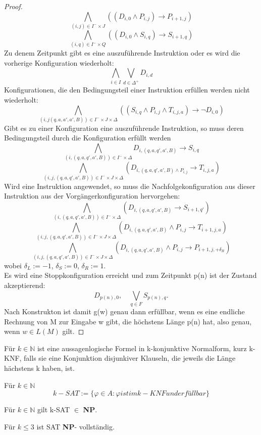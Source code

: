 \begin{proof}
\[        \]
        \[
            \bigwedge \limits_{(i, j) \in I^- \times J } ((D_{i,0} \wedge P_{i, j}) \to P_{i+ 1, j} )
        \]
        \[
            \bigwedge \limits_{(i,q) \in I^- \times Q } ((D_{i,0} \wedge S_{i, q}) \to S_{i+ 1, q})
        \]
        Zu denem Zeitpunkt gibt es eine auszuführende Instruktion oder es wird die vorherige Konfiguration wiederholt:
        \[
            \bigwedge \limits_{i \in I} \bigvee \limits_{d \in \Delta^+} D_{i, d}
        \]
        Konfigurationen, die den Bedingungsteil einer Instruktion erfüllen werden nicht wiederholt:
        \[
            \bigwedge \limits_{(i, j(q, a, a', a', B)) \in I^- \times J \times \Delta} ((S_{i, q} \wedge P_{i, j} \wedge T_{i, j, a}) \to \lnot D_{i, 0})  
        \]
        Gibt es zu einer Konfiguration eine auszuführende Instruktion, so muss deren Bedingungsteil durch die Konfiguration erfüllt werden
        \[
            \bigwedge \limits_{(i, (q, a, q', a', B)) \in I^- \times \Delta} D_{i, (q, a, q',a',B)} \to S_{i,q}
        \]  
        \[
            \bigwedge \limits_{(i, j,(q, a, q', a', B)) \in I^- \times J \times  \Delta} (D_{i, (q, a, q',a',B) \wedge P_{i, j}} \to T_{i,j, a})
        \]  
        Wird eine Instruktion angewendet, so muss die Nachfolgekonfiguration aus dieser Instruktion aus der Vorgängerkonfiguration hervorgehen:
        \[
            \bigwedge \limits_{(i, (q, a, q', a', B)) \in I^- \times \Delta} (D_{i, (q, a, q',a',B)} \to S_{i + 1, q'})
        \]  
        \[
            \bigwedge \limits_{(i, j, (q, a, q', a', B)) \in I^- \times J \times \Delta} (D_{i, (q, a, q',a',B)} \wedge P_{i, j} \to T_{i + 1, j, a})
        \] 
        \[
            \bigwedge \limits_{(i, j, (q, a, q', a', B)) \in I^- \times J \times \Delta} (D_{i, (q, a, q',a',B)}\wedge P_{i, j} \to P_{i + 1, j, + \delta_B})
        \]  
        wobei \(\delta_L := -1\), \(\delta_S := 0\), \(\delta_R:= 1\).
        \vspace*{0.5cm}
        \\
        Es wird eine Stoppkonfiguration erreicht und zum Zeitpunkt p(n) ist der Zustand akzeptierend:
        \[
            D_{p(n), 0}, \quad \bigvee \limits_{q \in F} S_{p(n), q}.    
        \]
        Nach Konstrukton ist damit g(w) genau dann erfüllbar, wenn es eine endliche Rechnung von M zur Eingabe w gibt, die höchstens Länge p(n) hat, also genau, wenn \(w \in L(M)\) gilt.
    \end{proof}

    Für \(k \in \mathbb{N}\) ist eine aussagenlogische Formel in k-konjunktive Normalform, kurz k-KNF, falls sie eine Konjunktion disjunkiver Klauseln, die jeweils die Länge hächstens k haben, ist.

    Für \(k \in \mathbb{N}\)
    \[
        k-SAT := \{ \varphi \in A : \varphi ist im k-KNF und erfüllbar\}     
    \]

    Für \(k \in \mathbb{N}\) gilt k-SAT \(\in\) \textbf{NP}.

    Für \(k \leq 3\) ist SAT \textbf{NP}- vollständig.
